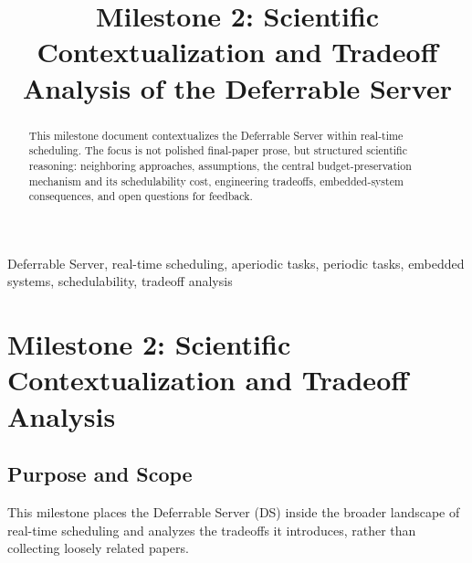 \documentclass[conference]{IEEEtran}
\begin{document}
\title{Milestone 2: Scientific Contextualization and Tradeoff Analysis of the Deferrable Server}

\author{
}

\maketitle

\begin{abstract}
This milestone document contextualizes the Deferrable Server within real-time
scheduling. The focus is not polished final-paper prose, but structured
scientific reasoning: neighboring approaches, assumptions, the central
budget-preservation mechanism and its schedulability cost, engineering
tradeoffs, embedded-system consequences, and open questions for feedback.
\end{abstract}

\begin{IEEEkeywords}
Deferrable Server, real-time scheduling, aperiodic tasks, periodic tasks, embedded systems, schedulability, tradeoff analysis
\end{IEEEkeywords}

\section{Milestone 2: Scientific Contextualization and Tradeoff Analysis}


\subsection{Purpose and Scope}

This milestone places the Deferrable Server (DS) inside the broader landscape
of real-time scheduling and analyzes the tradeoffs it introduces, rather than
collecting loosely related papers.
\end{document}

